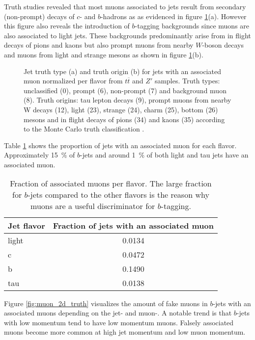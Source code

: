 Truth studies revealed that most muons associated to jets result from secondary (non-prompt) decays of $c$- and $b$-hadrons as as evidenced in figure \ref{fig:muonTruth}(a). However this figure also reveals the introduction of $b$-tagging backgrounds since muons are also associated to light jets. These backgrounds predominantly arise from in flight decays of pions and kaons but also prompt muons from nearby $W$-boson decays and muons from light and strange mesons as shown in figure \ref{fig:muonTruth}(b).
\begin{figure}[]
  \centering
  \caption{Jet truth type (a) and truth origin (b) for jets with an associated muon normalized per flavor from $t\overline{t}$ and $Z'$ samples. Truth types: unclassified (0), prompt (6), non-prompt (7) and background muon (8). Truth origins: tau lepton decays (9), prompt muons from nearby W decays (12), light (23), strange (24), charm (25), bottom (26) mesons and in flight decays of pions (34) and kaons (35) according to the Monte Carlo truth classification \citep{mctruthclassification}.}
  \label{fig:muonTruth}
\end{figure}
Table \ref{tab:MuonJetFlavors} shows the proportion of jets with an associated muon for each flavor. Approximately \qty{15}{\percent} of $b$-jets and around \qty{1}{\percent} of both light and tau jets have an associated muon.
\begin{table}[]
  \caption{Fraction of associated muons per flavor. The large fraction for $b$-jets compared to the other flavors is the reason why muons are a useful discriminator for $b$-tagging. }
  \label{tab:MuonJetFlavors}
  \centering
  \begin{tabular}{ l c }
    \hline
    Jet flavor & Fraction of jets with an associated muon \\
    \hline
    light      & 0.0134                                   \\
    c          & 0.0472                                   \\
    b          & 0.1490                                   \\
    tau        & 0.0138                                   \\
    \hline
  \end{tabular}
\end{table}
Figure \ref{fig:muon_2d_truth} visualizes the amount of fake muons in $b$-jets with an associated muons depending on the jet- and muon-\pt. A notable trend is that $b$-jets with low momentum tend to have low momentum muons. Falsely associated muons become more common at high jet momentum and low muon momentum.
